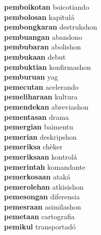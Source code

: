 \textbf{pemboikotan } boicotiando \\
\textbf{pembolosan } kapitulá \\
\textbf{pembongkaran } destrukshon \\
\textbf{pembuangan } abandono \\
\textbf{pembubaran } abolishon \\
\textbf{pembukaan } debut \\
\textbf{pembuktian } konfirmashon \\
\textbf{pemburuan } yag \\
\textbf{pemecutan } acelerando \\
\textbf{pemeliharaan } kultura \\
\textbf{pemendekan } abreviashon \\
\textbf{pementasan } drama \\
\textbf{pemergian } baimentu \\
\textbf{pemerian } deskripshon \\
\textbf{pemeriksa } chèker \\
\textbf{pemeriksaan } kontrolá \\
\textbf{pemerintah } komandante \\
\textbf{pemerkosaan } ataká \\
\textbf{pemerolehan } atkisishon \\
\textbf{pemesongan } diferensia \\
\textbf{pemesraan } asimilashon \\
\textbf{pemetaan } cartografia \\
\textbf{pemikul } transportadó \\
